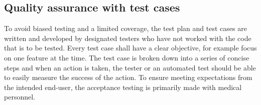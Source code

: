 \subsection{Quality assurance with test cases}
To avoid biased testing and a limited coverage, the test plan and test cases are written and developed by designated testers who have not worked with the code that is to be tested. Every test case shall have a clear objective, for example focus on one feature at the time. The test case is broken down into a series of concise steps and when an action is taken, the tester or an automated test should be able to easily measure the success of the action. To ensure meeting expectations from the intended end-user, the acceptance testing is primarily made with medical personnel.
